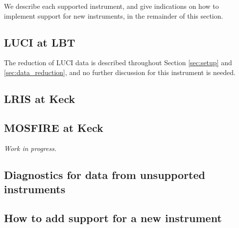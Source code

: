 \documentclass[a4paper]{article}
\begin{document}
We describe each supported instrument, and give indications on how to implement support for new instruments, in the remainder of this section.


\subsection{LUCI at LBT}

The reduction of LUCI data is described throughout Section \ref{sec:setup} and \ref{sec:data_reduction}, and no further discussion for this instrument is needed.


\subsection{LRIS at Keck}


\subsection{MOSFIRE at Keck}

\emph{Work in progress.}



\subsection{Diagnostics for data from unsupported instruments}
\label{sec:minimal}


\subsection{How to add support for a new instrument}
\end{document}
